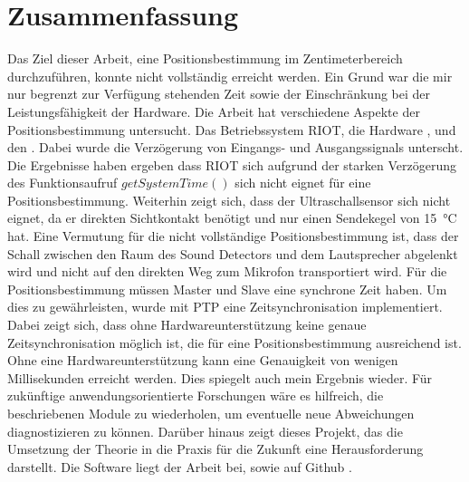 \newpage
\section{Zusammenfassung}

Das Ziel dieser Arbeit, eine Positionsbestimmung im Zentimeterbereich durchzuführen, konnte nicht vollständig erreicht werden. Ein Grund war die mir nur begrenzt zur Verfügung stehenden Zeit sowie der Einschränkung bei der Leistungsfähigkeit der Hardware.
Die Arbeit hat verschiedene Aspekte der Positionsbestimmung untersucht. Das Betriebssystem RIOT, die Hardware \microphone, \platz und den \ultraschall. Dabei wurde die Verzögerung von Eingangs- und Ausgangssignals unterscht.
\\
Die Ergebnisse haben ergeben dass RIOT sich aufgrund der starken Verzögerung des Funktionsaufruf $getSystemTime()$ sich nicht eignet für eine Positionsbestimmung. Weiterhin zeigt sich, dass der Ultraschallsensor sich nicht eignet, da er direkten Sichtkontakt benötigt und nur einen Sendekegel von \SI{15}{\degreeCelsius} hat. Eine Vermutung für die nicht vollständige Positionsbestimmung ist, dass der Schall zwischen den Raum des Sound Detectors und dem Lautsprecher abgelenkt wird und nicht auf den direkten Weg zum Mikrofon transportiert wird. Für die Positionsbestimmung müssen Master und Slave eine synchrone Zeit haben. Um dies zu gewährleisten, wurde mit PTP eine Zeitsynchronisation implementiert. Dabei zeigt sich, dass ohne Hardwareunterstützung keine genaue Zeitsynchronisation möglich ist, die für eine Positionsbestimmung ausreichend ist. Ohne eine Hardwareunterstützung kann eine Genauigkeit von wenigen Millisekunden erreicht werden. Dies spiegelt auch mein Ergebnis wieder. Für zukünftige anwendungsorientierte Forschungen wäre es hilfreich, die beschriebenen Module zu wiederholen, um eventuelle neue Abweichungen diagnostizieren zu können. Darüber hinaus zeigt dieses Projekt, das die Umsetzung der Theorie in die Praxis für die Zukunft eine Herausforderung darstellt. Die Software liegt der Arbeit bei, sowie auf Github \cite{src_GITHUB_CODE_BA}\cite{src_genauigkeit_zeit_sync} .


